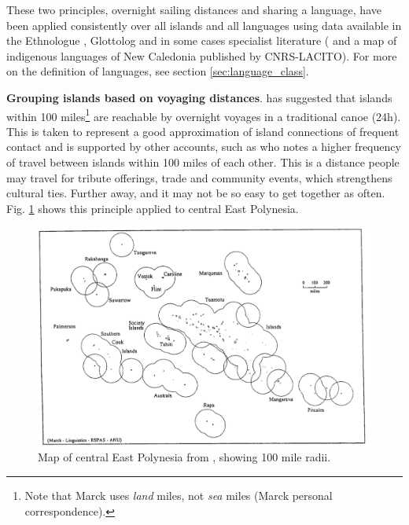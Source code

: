 \documentclass[a4paper,10pt]{article} %
\begin{document}
These two principles, overnight sailing distances and sharing a language, have been applied consistently over all islands and all languages using data available in the Ethnologue \citep{ethnologue22}, Glottolog \citep{glottolog3} and in some cases specialist literature (\citet{faaniu1983tuvalu,charpentier2012linguistic, francoisetatl2015, macdonald_2020, omniglot_tuvaluan} and a map of indigenous languages of New Caledonia published by CNRS-LACITO). For more on the definition of languages, see section \ref{sec:language_class}.




\textbf{Grouping islands based on voyaging distances}. \citet{mark_1986, marck2000} has suggested that islands within 100 miles\footnote{Note that Marck uses \emph{land} miles, not \emph{sea} miles (Marck personal correspondence).} are reachable by overnight voyages in a traditional canoe (24h). This is taken to represent a good approximation of island connections of frequent contact and is supported by other accounts, such as \citep[38]{gladwin2009east} who notes a higher frequency of travel between islands within 100 miles of each other. This is a distance people may travel for tribute offerings, trade and community events, which strengthens cultural ties. Further away, and it may not be so easy to get together as often. Fig. \ref{Marck_2000_east_poly} shows this principle applied to central East Polynesia.

\begin{figure}[ht]
\centering
\includegraphics[width=13cm]{marck_2000_east_poly.png}
\caption{{Map of central East Polynesia from \citet{marck2000}, showing 100 mile radii.}}
\label{Marck_2000_east_poly}
\end{figure}
\end{document}
